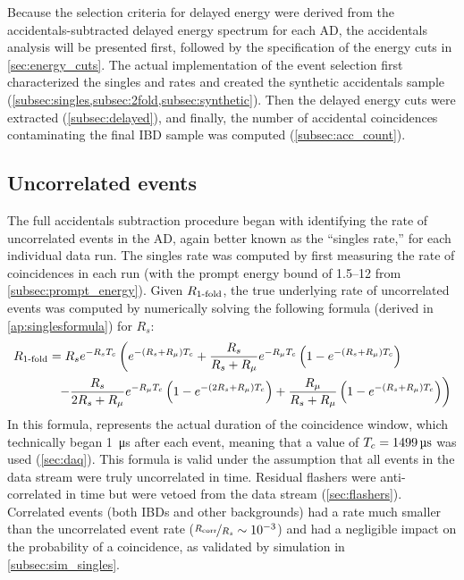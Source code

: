 Because the selection criteria for delayed energy
were derived from the accidentals-subtracted delayed energy spectrum for each AD,
the accidentals analysis will be presented first,
followed by the specification of the energy cuts in \cref{sec:energy_cuts}.
The actual implementation of the event selection
first characterized the singles and  rates
and created the synthetic accidentals sample
(\cref{subsec:singles,subsec:2fold,subsec:synthetic}).
Then the delayed energy cuts were extracted (\cref{subsec:delayed}),
and finally, the number of accidental coincidences
contaminating the final IBD sample was computed (\cref{subsec:acc_count}).

\subsection{Uncorrelated events}
\label{subsec:singles}

The full accidentals subtraction procedure began with identifying
the rate of uncorrelated events in the AD, again better known
as the ``singles rate,'' for each individual data run.
The singles rate was computed by first measuring the rate of
 coincidences in each run
(with the prompt energy bound of \SIrange{1.5}{12}{\mev} from \cref{subsec:prompt_energy}).
Given $R_\text{\ensuremath{1}-fold}$, the true underlying rate of uncorrelated events was
computed by numerically solving the following formula
(derived in \cref{ap:singlesformula}) for $R_s$:
\begin{align}
    \label{eq:rsingles}
    \begin{split}
        R_{\text{\fold{1}}}
          &= R_s e^{-R_s\tc}
          \left(
              e^{-(R_s + R_\mu)\tc} +
              \frac{R_s}{R_s+R_\mu} e^{-R_\mu\tc}
              \left(
                  1 - e^{-(R_s + R_\mu)\tc}
              \right)
          \right. \\
          &\ \ %
          \left. - \frac{R_s}{2R_s + R_\mu} e^{-R_\mu\tc}
              \left(
                  1 - e^{-(2R_s + R_\mu)\tc}
              \right) +
              \frac{R_\mu}{R_s + R_\mu}
              \left(
                  1 - e^{-(R_s + R_\mu)\tc}
              \right)
          \right)
    \end{split}
\end{align}
In this formula, \tc{} represents the actual duration of the coincidence window,
which technically began \SI{1}{\micro\second} after each event,
meaning that a value of $T_c=\SI{1499}{\micro\second}$ was used (\cref{sec:daq}).
This formula is valid under the assumption that all
events in the data stream were truly uncorrelated in time.
Residual flashers were anti-correlated in time
but were vetoed from the data stream (\cref{sec:flashers}).
Correlated events (both IBDs and other backgrounds)
had a rate much smaller than the uncorrelated event rate
($\nicefrac{R_{\text{corr}}}{R_s} \sim 10^{-3}$)
and had a negligible impact on the probability of a  coincidence,
as validated by simulation in \cref{subsec:sim_singles}.

